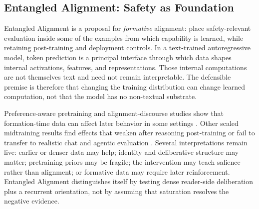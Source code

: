 \documentclass[11pt]{article}
\begin{document}
	\subsection{Entangled Alignment: Safety as Foundation}
	
		Entangled Alignment is a proposal for \emph{formative} alignment: place safety-relevant evaluation inside some of the examples from which capability is learned, while retaining post-training and deployment controls. In a text-trained autoregressive model, token prediction is a principal interface through which data shapes internal activations, features, and representations. Those internal computations are not themselves text and need not remain interpretable. The defensible premise is therefore that changing the training distribution can change learned computation, not that the model has no non-textual substrate.

		Preference-aware pretraining and alignment-discourse studies show that formation-time data can affect later behavior in some settings \cite{korbak2023pretraining,betley2025alignment}. Other scaled midtraining results find effects that weaken after reasoning post-training or fail to transfer to realistic chat and agentic evaluation \cite{openai2026midtraining}. Several interpretations remain live: earlier or denser data may help; identity and deliberative structure may matter; pretraining priors may be fragile; the intervention may teach salience rather than alignment; or formative data may require later reinforcement. Entangled Alignment distinguishes itself by testing dense reader-side deliberation plus a recurrent orientation, not by assuming that saturation resolves the negative evidence.
\end{document}
